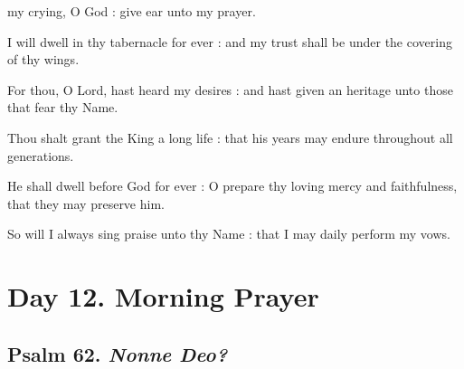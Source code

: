  my crying, O God : give ear unto my prayer.\par
{}
I will dwell in thy tabernacle for ever : and my trust shall be under the covering of thy wings.\par
{}For thou, O Lord, hast heard my desires : and hast given an heritage unto those that fear thy Name.\par
{}Thou shalt grant the King a long life : that his years may endure throughout all generations.\par
{}He shall dwell before God for ever : O prepare thy loving mercy and faithfulness, that they may preserve him.\par
{}So will I always sing praise unto thy Name : that I may daily perform my vows.\par

\section*{Day 12. Morning Prayer}

\subsection{Psalm 62. \textit{Nonne Deo?}}

